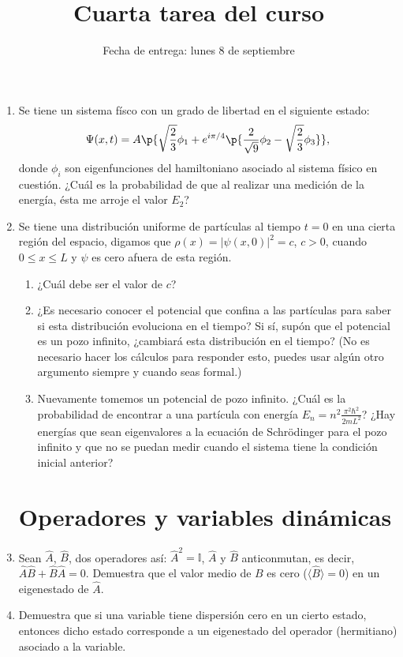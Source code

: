 \documentclass[10pt,letterpaper]{article}
\title{Cuarta tarea del curso}
\date{Fecha de entrega: lunes 8 de septiembre}
\begin{document}
\maketitle



\begin{enumerate}
\section*{Ecuación completa de Schrödinger y la Regla de Born}
\item Se tiene un sistema físco con un grado de libertad en el siguiente estado:
\begin{equation}
\Psi(x,t) = A\p{\sqrt{\frac{2}{3}}\phi_1 + e^{i\pi /4}\p{\frac{2}{\sqrt{9}}\phi_2 - \sqrt{\frac{2}{3}}\phi_3}},
\end{equation}
donde $\phi_i$ son eigenfunciones del hamiltoniano asociado al sistema físico en cuestión. ¿Cuál es la probabilidad de que al realizar una medición de la energía, ésta me arroje el valor $E_2$?
\item Se tiene una distribución uniforme de partículas al tiempo $t=0$ en una cierta región del espacio, digamos que $\rho(x)=|\psi(x,0)|^2=c$, $c > 0$, cuando $0\leq x \leq L$ y $\psi$ es cero afuera de esta región.
\begin{enumerate}
\renewcommand{\theenumi}{\Alph{enumi}}
\item ¿Cuál debe ser el valor de $c$?
\item ¿Es necesario conocer el potencial que confina a las partículas para saber si esta distribución evoluciona en el tiempo? Si sí, supón que el potencial es un pozo infinito, ¿cambiará esta distribución en el tiempo? (No es necesario hacer los cálculos para responder esto, puedes usar algún otro argumento siempre y cuando seas formal.)
\item Nuevamente tomemos un potencial de pozo infinito. ¿Cuál es la probabilidad de encontrar a una partícula con energía $E_n={n}^2\frac{\pi^2\hbar^2}{2mL^2}$? ¿Hay energías que sean eigenvalores a la ecuación de Schrödinger para el pozo infinito y que no se puedan medir cuando el sistema tiene la condición inicial anterior?
\end{enumerate}
\section*{Operadores y variables dinámicas}
\item Sean $\hat{A}$, $\hat{B}$, dos operadores así: $\hat{A}^2 = \mathbb{I}$, $\hat{A}$ y $\hat{B}$ anticonmutan, es decir, $\hat{A}\hat{B} + \hat{B}\hat{A} = 0$. Demuestra que el valor medio de $B$ es cero ($\langle \hat{B} \rangle = 0$) en un eigenestado de $\hat{A}$.
\item Demuestra que si una variable tiene dispersión cero en un cierto estado, entonces dicho estado corresponde a un eigenestado del operador (hermitiano) asociado a la variable.
\end{enumerate}
\end{document}
